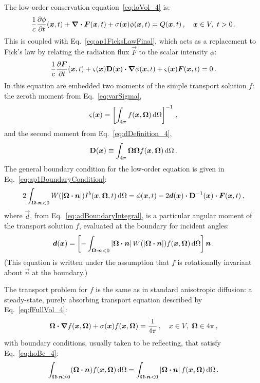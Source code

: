 The low-order conservation equation~\eqref{eq:loVol_4} is:
\begin{equation*}
\frac{1}{c} \frac{\partial \phi}{\partial t} (\bm{x}, t)
+ \bm{\nabla} \bm{\cdot} \bm{F}(\bm{x},t)
+ \sigma(\bm{x}) \phi(\bm{x}, t)
  = Q(\bm{x}, t) \,,
  \quad \bm{x} \in V,\ t > 0 \,.
\end{equation*}
This is coupled with Eq.~\eqref{eq:ap1FicksLawFinal}, which acts as a
replacement to Fick's law by relating the radiation flux $\vec{F}$ to the
scalar intensity $\phi$:
\begin{equation*}
  \frac{1}{c}\frac{\partial \bm{F}}{\partial t}(\bm{x},t)
  + \varsigma(\bm{x}) \mathbf{D}(\bm{x}) \bm{\cdot} \bm{\nabla} \phi(\bm{x}, t)
  + \varsigma(\bm{x})\bm{F}(\bm{x},t) 
  = 0 \,.
\end{equation*}
In this equation are embedded two moments of the simple transport solution $f$:
the zeroth moment from Eq.~\eqref{eq:varSigma},
\begin{equation*}
  \varsigma(\bm{x})
  = \left[ \int_{4\pi} f(\bm{x},\bm{\Omega}) \mathop{}\!\mathrm{d} \Omega \right]^{-1} \,,
\end{equation*}
and the second moment from Eq.~\eqref{eq:dDefinition_4},
\begin{equation*}
  \mathbf{D}(\bm{x}) \equiv \int_{4\pi} \bm{\Omega} \bm{\Omega}
  f(\bm{x}, \bm{\Omega}) \mathop{}\!\mathrm{d}\Omega \,.
\end{equation*}
The general boundary condition for the low-order equation is given in
Eq.~\eqref{eq:ap1BoundaryCondition}:
\begin{equation*}
  2 \int_{\bm{\Omega}\bm{\cdot}\bm{n} < 0}
  W(\left| \bm{\Omega}\bm{\cdot}\bm{n} \right|) I^b(\bm{x},\bm{\Omega},t) \mathop{}\!\mathrm{d}\Omega
  = \phi(\bm{x},t)
  - 2 \bm{d}(\bm{x}) \bm{\cdot} \mathbf{D}^{-1}(\bm{x}) \bm{\cdot} \bm{F}(\bm{x},t) \,,
\end{equation*}
where $\vec{d}$, from Eq.~\eqref{eq:adBoundaryIntegral}, is a particular
angular moment of the transport solution $f$, evaluated at the boundary for
incident angles:
\begin{equation*}
  \bm{d}(\bm{x})
  = \left[ - \int_{\bm{\Omega}\bm{\cdot}\bm{n} < 0}
  \left| \bm{\Omega}\bm{\cdot}\bm{n} \right| W(\left| \bm{\Omega}\bm{\cdot}\bm{n} \right|)
  f(\bm{x}, \bm{\Omega}) \mathop{}\!\mathrm{d}\Omega\right] \bm{n}\,.
\end{equation*}
(This equation is written under the assumption that $f$ is rotationally
invariant about $\vec{n}$ at the boundary.)

The transport problem for $f$ is the same as in standard anisotropic diffusion:
a steady-state, purely absorbing transport
equation described by Eq.~\eqref{eq:fFullVol_4}:
\begin{equation*}
  \bm{\Omega}\bm{\cdot} \bm{\nabla} f(\bm{x}, \bm{\Omega})
  + \sigma(\bm{x}) f (\bm{x}, \bm{\Omega}) 
  = \frac{1}{4\pi} \,, \quad x \in V,\ \bm{\Omega} \in 4\pi\,,
\end{equation*}
with boundary conditions, usually taken to be reflecting, that satisfy
Eq.~\eqref{eq:hoBc_4}:
\begin{equation*}
  \int_{\bm{\Omega}\bm{\cdot}\bm{n} > 0} (\bm{\Omega}\bm{\cdot} \bm{n})
  f(\bm{x}, \bm{\Omega}) \mathop{}\!\mathrm{d}\Omega
  =
  \int_{\bm{\Omega}\bm{\cdot}\bm{n} < 0} \left| \bm{\Omega}\bm{\cdot} \bm{n} \right|
  f(\bm{x}, \bm{\Omega}) \mathop{}\!\mathrm{d}\Omega \,.
\end{equation*}

